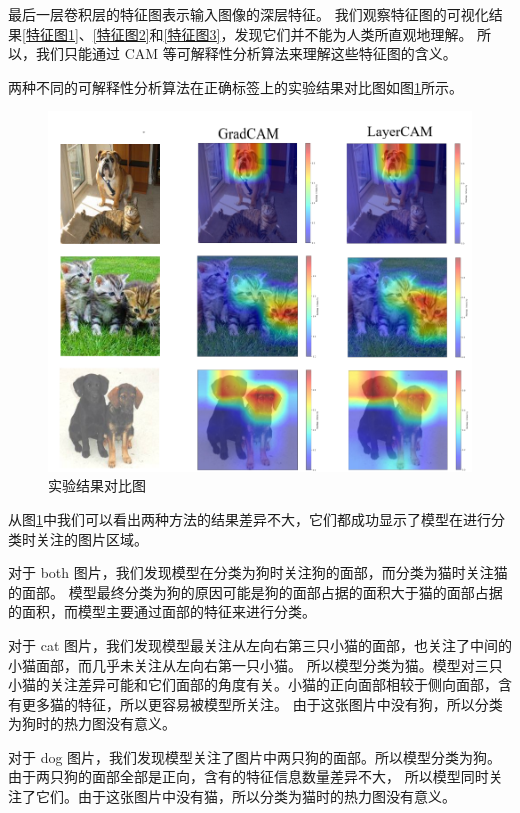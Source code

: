 \documentclass[supercite]{Experimental_Report}
\theoremstyle{definition}
\begin{document}
最后一层卷积层的特征图表示输入图像的深层特征。
我们观察特征图的可视化结果\ref{特征图1}、\ref{特征图2}和\ref{特征图3}，发现它们并不能为人类所直观地理解。
所以，我们只能通过 CAM 等可解释性分析算法来理解这些特征图的含义。

两种不同的可解释性分析算法在正确标签上的实验结果对比图如图\ref{对比图}所示。
\begin{figure}[H]
	\begin{center}
		\includegraphics[scale=0.7]{../images/all.png}
		\caption{实验结果对比图}
		\label{对比图}
	\end{center}
\end{figure}

从图\ref{对比图}中我们可以看出两种方法的结果差异不大，它们都成功显示了模型在进行分类时关注的图片区域。

对于 both 图片，我们发现模型在分类为狗时关注狗的面部，而分类为猫时关注猫的面部。
模型最终分类为狗的原因可能是狗的面部占据的面积大于猫的面部占据的面积，而模型主要通过面部的特征来进行分类。

对于 cat 图片，我们发现模型最关注从左向右第三只小猫的面部，也关注了中间的小猫面部，而几乎未关注从左向右第一只小猫。
所以模型分类为猫。模型对三只小猫的关注差异可能和它们面部的角度有关。小猫的正向面部相较于侧向面部，含有更多猫的特征，所以更容易被模型所关注。
由于这张图片中没有狗，所以分类为狗时的热力图没有意义。

对于 dog 图片，我们发现模型关注了图片中两只狗的面部。所以模型分类为狗。由于两只狗的面部全部是正向，含有的特征信息数量差异不大，
所以模型同时关注了它们。由于这张图片中没有猫，所以分类为猫时的热力图没有意义。
\end{document}
